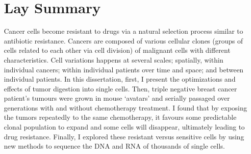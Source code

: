 

 \chapter{Lay Summary}

Cancer cells become resistant to drugs via a natural selection process similar to antibiotic resistance. Cancers are composed of various cellular clones (groups of cells related to each other via cell division) of malignant cells with different characteristics. Cell variations happens at several scales; spatially, within individual cancers; within individual patients over time and space; and between individual patients. In this dissertation, first, I present the optimizations and effects of tumor digestion into single cells. Then, triple negative breast cancer patient's tumours were grown in mouse `avatars' and serially passaged over generations with and without chemotherapy treatment. I found that by exposing the tumors repeatedly to the same chemotherapy, it favours some predictable clonal population to expand and some cells will disappear, ultimately leading to drug resistance. Finally, I explored these resistant versus sensitive cells by using new methods to sequence the DNA and RNA of thousands of single cells.




